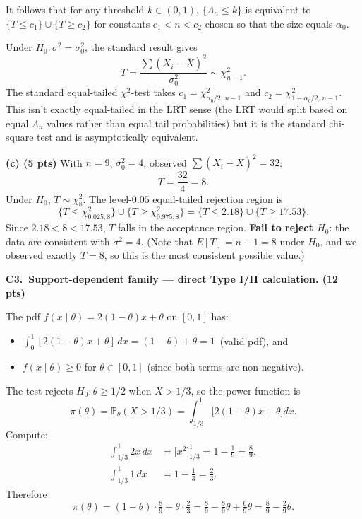 \documentclass[11pt]{article}
\begin{document}
It follows that for any threshold $k \in (0, 1)$, $\{\Lambda_n \le k\}$ is equivalent to $\{T \le c_1\}\cup\{T \ge c_2\}$ for constants $c_1 < n < c_2$ chosen so that the size equals $\alpha_0$.

Under $H_0\!: \sigma^2 = \sigma_0^2$, the standard result gives
\[
    T = \frac{\sum (X_i - \overline{X})^2}{\sigma_0^2} \sim \chi^2_{n-1}.
\]
The standard equal-tailed $\chi^2$-test takes $c_1 = \chi^2_{\alpha_0/2,\, n-1}$ and $c_2 = \chi^2_{1 - \alpha_0/2,\, n-1}$. This isn't exactly equal-tailed in the LRT sense (the LRT would split based on equal $\Lambda_n$ values rather than equal tail probabilities) but it is the standard chi-square test and is asymptotically equivalent.

\textbf{(c) (5 pts)} With $n = 9$, $\sigma_0^2 = 4$, observed $\sum(X_i - \overline{X})^2 = 32$:
\[
    T = \frac{32}{4} = 8.
\]
Under $H_0$, $T \sim \chi^2_8$. The level-$0.05$ equal-tailed rejection region is
\[
    \{T \le \chi^2_{0.025, 8}\} \cup \{T \ge \chi^2_{0.975, 8}\} = \{T \le 2.18\} \cup \{T \ge 17.53\}.
\]
Since $2.18 < 8 < 17.53$, $T$ falls in the acceptance region. \textbf{Fail to reject $H_0$}: the data are consistent with $\sigma^2 = 4$. (Note that $E[T] = n - 1 = 8$ under $H_0$, and we observed exactly $T = 8$, so this is the most consistent possible value.)

\vspace{0.6em}

\textbf{C3.\ Support-dependent family --- direct Type I/II calculation. (12 pts)}

The pdf $f(x \mid \theta) = 2(1-\theta)x + \theta$ on $[0,1]$ has:
\begin{itemize}[leftmargin=2em, itemsep=0pt]
    \item $\int_0^1 [2(1-\theta)x + \theta]\,dx = (1-\theta) + \theta = 1$ \,(valid pdf), and
    \item $f(x\mid\theta) \ge 0$ for $\theta \in [0,1]$ (since both terms are non-negative).
\end{itemize}
The test rejects $H_0\!: \theta \ge 1/2$ when $X > 1/3$, so the power function is
\[
    \pi(\theta) = \mathbb{P}_\theta(X > 1/3) = \int_{1/3}^{1}\bigl[2(1-\theta)x + \theta\bigr]dx.
\]
Compute:
\begin{align*}
    \int_{1/3}^{1} 2x\,dx &= \bigl[x^2\bigr]_{1/3}^{1} = 1 - \tfrac{1}{9} = \tfrac{8}{9}, \\
    \int_{1/3}^{1} 1\,dx &= 1 - \tfrac{1}{3} = \tfrac{2}{3}.
\end{align*}
Therefore
\[
    \pi(\theta) = (1-\theta)\cdot \tfrac{8}{9} + \theta \cdot \tfrac{2}{3}
    = \tfrac{8}{9} - \tfrac{8}{9}\theta + \tfrac{6}{9}\theta
    = \tfrac{8}{9} - \tfrac{2}{9}\theta.
\]
\end{document}
